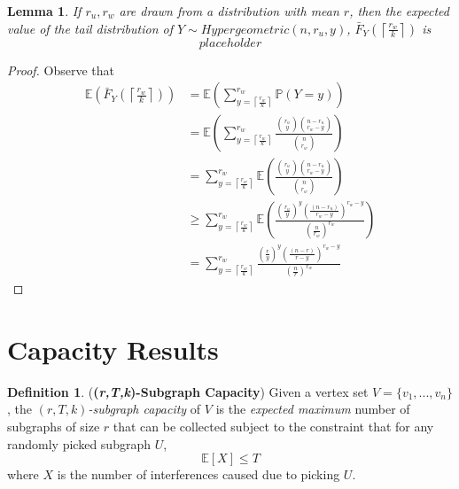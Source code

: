 \documentclass[10pt]{extarticle}
\newcommand{\E}{\mathbb{E}}
\newtheorem{lemma}[theorem]{Lemma}
\theoremstyle{definition}
\newtheorem{definition}[theorem]{Definition}
\begin{document}
\begin{lemma}
    \label{lemma:tail-expectation}
        If $r_u, r_w$ are drawn from a distribution with mean $r$, then the expected value of the tail distribution of $Y \sim Hypergeometric(n, r_u, y)$, $\bar{F}_Y\left(\left\lceil \frac{r_w}{k} \right\rceil\right)$ is $$placeholder$$
    \end{lemma}
    \begin{proof}
        Observe that
        \begin{equation}
        \begin{split}
            \mathbb{E} \left( \bar{F}_Y\left(\left\lceil \frac{r_w}{k} \right\rceil\right) \right) &=
            \mathbb{E} \left( \sum_{y = \left\lceil \frac{r_w}{k} \right\rceil}^{r_w} \mathbb{P}(Y=y) \right) \\ &= \mathbb{E}  \left( \sum_{y = \left\lceil \frac{r_w}{k} \right\rceil}^{r_w} \frac{\binom{r_u}{y} \binom{n-r_u}{r_w-y}}{\binom{n}{r_w}} \right) \\ &=  \sum_{y = \left\lceil \frac{r_w}{k} \right\rceil}^{r_w} \mathbb{E} \left(\frac{\binom{r_u}{y} \binom{n-r_u}{r_w-y}}{\binom{n}{r_w}}  \right) \\ &\ge \sum_{y = \left\lceil \frac{r_w}{k} \right\rceil}^{r_w} \mathbb{E} 
            \left(
                \frac
                {
                    \left(\frac{r_u}{y}\right)^{y} \left(\frac{(n-r_u)}{r_w - y}\right)^{r_w-y}
                }
                {
                    \left(\frac{n}{r_w}\right)^{r_w}
                }  
            \right) \\ &= 
            \sum_{y = \left\lceil \frac{r_w}{k} \right\rceil}^{r_w}
                \frac
                {
                    \left(\frac{r}{y}\right)^{y} \left(\frac{(n-r)}{r - y}\right)^{r_w-y}
                }
                {
                    \left(\frac{n}{r}\right)^{r_w}
                }  
        \end{split}
    \end{equation}
    \end{proof}

\section{Capacity Results}

\begin{definition} (\textbf{(\textit{r,T,k})-Subgraph Capacity}) Given a vertex set $V = \{v_1,...,v_n\}$, the \textit{$(r,T,k)$-subgraph capacity} of $V$ is the \textit{expected maximum} number of subgraphs of size $r$ that can be collected subject to the constraint that for any randomly picked subgraph $U$, 
\begin{equation}
\label{equ:cap-bound}
    \E[X] \le T
\end{equation}
where $X$ is the number of interferences caused due to picking $U$. 
\end{definition}
\end{document}
